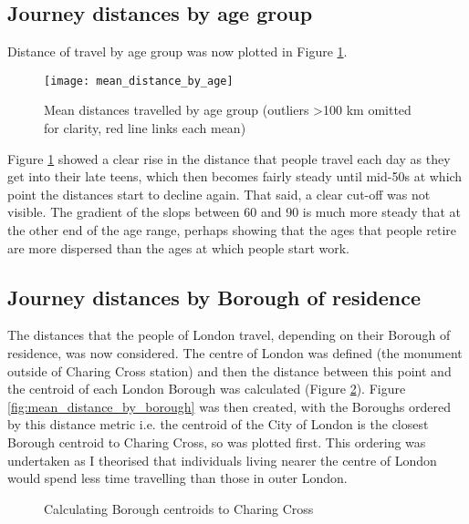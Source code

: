 \subsection{Journey distances by age group}
\label{sec:journey_distances_by_age_group}

Distance of travel by age group was now plotted in Figure \ref{fig:mean_distance_by_age}.

\begin{landscape}

\begin{figure}[H]
\centering
\texttt{[image: mean\_distance\_by\_age]}
\caption{Mean distances travelled by age group (outliers \textgreater 100 km omitted for clarity, red line links each mean)}
\label{fig:mean_distance_by_age}
\end{figure}

\end{landscape}

Figure \ref{fig:mean_distance_by_age} showed a clear rise in the distance that people travel each day as they get into their late teens, which then becomes fairly steady until mid-50s at which point the distances start to decline again. That said, a clear cut-off was not visible. The gradient of the slops between 60 and 90 is much more steady that at the other end of the age range, perhaps showing that the ages that people retire are more dispersed than the ages at which people start work.

\subsection{Journey distances by Borough of residence}
\label{sec:journey_distances_by_borough_of_residence}

The distances that the people of London travel, depending on their Borough of residence, was now considered. The centre of London was defined (the monument outside of Charing Cross station) and then the distance between this point and the centroid of each London Borough was calculated (Figure \ref{fig:borough_centroids}). Figure \ref{fig:mean_distance_by_borough} was then created, with the Boroughs ordered by this distance metric i.e. the centroid of the City of London is the closest Borough centroid to Charing Cross, so was plotted first. This ordering was undertaken as I theorised that individuals living nearer the centre of London would spend less time travelling than those in outer London.

\begin{figure}[H]
\centering
{}
\caption{Calculating Borough centroids to Charing Cross}
\label{fig:borough_centroids}
\end{figure}

